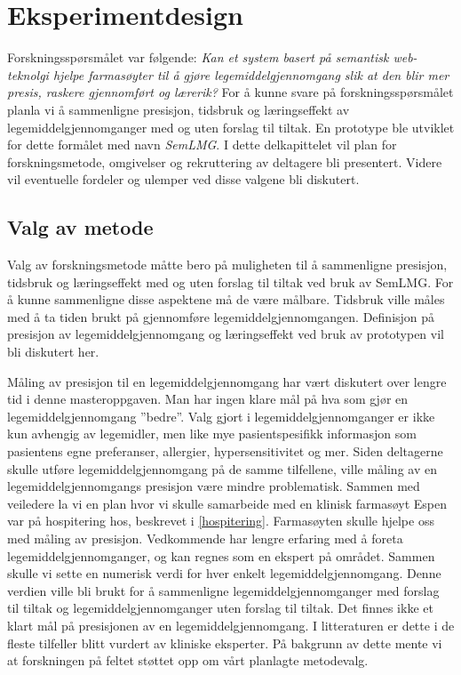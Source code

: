 \section{Eksperimentdesign}
Forskningsspørsmålet var følgende: \textit{Kan et system  basert på semantisk web-teknolgi hjelpe farmasøyter til å gjøre legemiddelgjennomgang slik at den blir mer presis, raskere gjennomført og lærerik?} For å kunne svare på forskningsspørsmålet planla vi å sammenligne presisjon, tidsbruk og læringseffekt av legemiddelgjennomganger med og uten forslag til tiltak. En prototype ble utviklet for dette formålet med navn \textit{SemLMG}. I dette delkapittelet vil plan for forskningsmetode, omgivelser og rekruttering av deltagere bli presentert. Videre vil eventuelle fordeler og ulemper ved disse valgene bli diskutert.  

\subsection{Valg av metode}
Valg av forskningsmetode måtte bero på muligheten til å sammenligne presisjon, tidsbruk og læringseffekt med og uten forslag til tiltak ved bruk av SemLMG. For å kunne sammenligne disse aspektene må de være målbare. Tidsbruk ville måles med å ta tiden brukt på gjennomføre legemiddelgjennomgangen. Definisjon på presisjon av legemiddelgjennomgang og læringseffekt ved bruk av prototypen vil bli diskutert her.

Måling av presisjon til en legemiddelgjennomgang har vært diskutert over lengre tid i denne masteroppgaven. Man har ingen klare mål på hva som gjør en legemiddelgjennomgang ''bedre''. Valg gjort i legemiddelgjennomganger er ikke kun avhengig av legemidler, men like mye pasientspesifikk informasjon som pasientens egne preferanser, allergier, hypersensitivitet og mer. Siden deltagerne skulle utføre legemiddelgjennomgang på de samme tilfellene, ville måling av en legemiddelgjennomgangs presisjon være mindre problematisk. Sammen med veiledere la vi en plan hvor vi skulle samarbeide med en klinisk farmasøyt Espen var på hospitering hos, beskrevet i \ref{hospitering}. Farmasøyten skulle hjelpe oss med måling av presisjon. Vedkommende har lengre erfaring med å foreta legemiddelgjennomganger, og kan regnes som en ekspert på området. Sammen skulle vi sette en numerisk verdi for hver enkelt legemiddelgjennomgang. Denne verdien ville bli brukt for å sammenligne legemiddelgjennomganger med forslag til tiltak og legemiddelgjennomganger uten forslag til tiltak. Det finnes ikke et klart mål på presisjonen av en legemiddelgjennomgang. I litteraturen er dette i de fleste tilfeller blitt vurdert av kliniske eksperter. På bakgrunn av dette mente vi at forskningen på feltet støttet opp om vårt planlagte metodevalg. 

